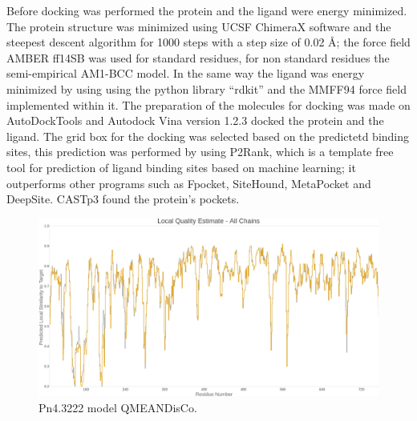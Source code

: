 \documentclass[12pt]{article}
\begin{document}
	Before docking was performed the protein and the ligand were energy minimized. The protein structure was minimized using UCSF ChimeraX software \cite{chimera,chimera_2} and the steepest descent algorithm for 1000 steps with a step size of 0.02 \r{A}; the force field AMBER ff14SB was used for standard residues, for non standard residues the semi-empirical AM1-BCC model. \cite{am1_bcc,am1_bcc_2,am1_bcc_3} In the same way the ligand was energy minimized by using using the python library ``rdkit'' and the MMFF94 force field implemented within it. \cite{rdkit,rdkit_mmff}	The preparation of the molecules for docking was made on AutoDockTools and Autodock Vina version 1.2.3 docked the protein and the ligand. \cite{adt,vina,vina_2} The grid box for the docking was selected based on the predictetd binding sites, this prediction was performed by using P2Rank, which is a template free tool for prediction of ligand binding sites based on machine learning; it outperforms other programs such as Fpocket, SiteHound, MetaPocket and DeepSite. \cite{krivak2018p2rank} CASTp3 found the protein's pockets.
	
	\FloatBarrier
	\begin{figure}
		\centering
		\includegraphics[width=\textwidth-50pt]{../8/Swiss/Local_quality_estimate.png}
		\caption{\centering Pn4.3222 model QMEANDisCo.}
		\label{fig8_2}
	\end{figure}
	\FloatBarrier
	
\end{document}
